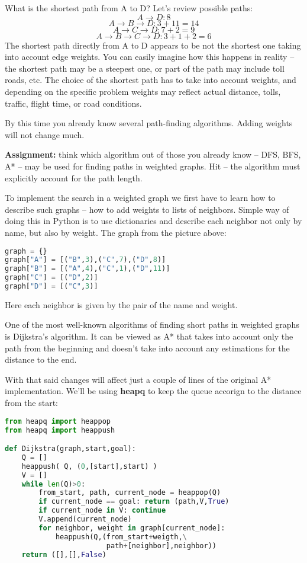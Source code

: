 What is the shortest path from A to D? Let's review possible paths:
$$
A \rightarrow D: 8
$$
$$
A \rightarrow B \rightarrow D: 3 + 11 = 14
$$
$$
A \rightarrow C \rightarrow D: 7 + 2 = 9
$$
$$
A \rightarrow B \rightarrow C \rightarrow D: 3 + 1 + 2 = 6
$$
The shortest path directly from A to D appears to be not the
shortest one taking into account edge weights. You can easily 
imagine how this happens in reality -- 
the shortest path may be a steepest one,
or part of the path may include toll roads, etc. 
The choice of the shortest
path has to take into account weights, and depending on the specific problem
weights may reflect actual distance, tolls, traffic,
flight time, or road conditions.

By this time you already know several path-finding algorithms. 
Adding weights will not change much.

\begin{tcolorbox}
\textbf{Assignment:} think which algorithm out of those you already
know -- DFS, BFS, A* -- may be used for finding paths in weighted graphs.
Hit -- the algorithm must explicitly account for the path length.
\end{tcolorbox}

To implement the search in a weighted graph we first have to learn
how to describe such graphs -- how to add weights to lists of
neighbors. Simple way of doing this in Python is to use dictionaries
and describe each neighbor not only by name, but also by weight. The graph
from the picture above:

\begin{lstlisting}[language=Python,style=codelst2,caption={Python: weighted graphs}]
graph = {}
graph["A"] = [("B",3),("C",7),("D",8)]
graph["B"] = [("A",4),("C",1),("D",11)]
graph["C"] = [("D",2)]
graph["D"] = [("C",3)]
\end{lstlisting}
Here each neighbor is given by the pair of the name and weight.

One of the most well-known algorithms of finding short paths in
weighted graphs is Dijkstra's algorithm. It can be viewed as A*
that takes into account only the path from the beginning and
doesn't take into account any estimations for the distance to the end.

With that said changes will affect just a couple of lines of
the original A* implementation. We'll be using \textbf{heapq}
to keep the queue accorign to the distance from the start:

\newpage

\begin{lstlisting}[language=Python,style=codelst2,caption={Python: Dijkstra search}]
from heapq import heappop
from heapq import heappush

def Dijkstra(graph,start,goal):
    Q = []
    heappush( Q, (0,[start],start) )
    V = []
    while len(Q)>0:
        from_start, path, current_node = heappop(Q)
        if current_node == goal: return (path,V,True)
        if current_node in V: continue
        V.append(current_node)
        for neighbor, weight in graph[current_node]:
            heappush(Q,(from_start+weigth,\
                        path+[neighbor],neighbor))
    return ([],[],False)
\end{lstlisting}

